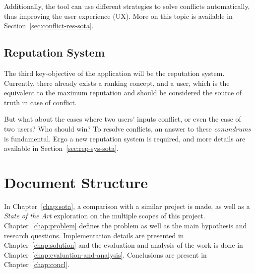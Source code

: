 Additionally, the tool can use different strategies to solve conflicts automatically, thus improving the user experience (UX). More on this topic is available in Section~\ref{sec:conflict-res-sota}.

\subsection*{Reputation System} \label{sec:rep-sys-intro}

The third key-objective of the application will be the reputation system. Currently, there already exists a ranking concept, and a  user, which is the equivalent to the maximum reputation and should be considered the source of truth in case of conflict.

But what about the cases where two  users' inputs conflict, or even the case of two  users? Who should win? To resolve conflicts, an answer to these \textit{conundrums} is fundamental. Ergo a new reputation system is required, and more details are available in Section~\ref{sec:rep-sys-sota}.

\section{Document Structure}

In Chapter~\ref{chap:sota}, a comparison with a similar project is made, as well as a \textit{State of the Art} exploration on the multiple scopes of this project. Chapter~\ref{chap:problem} defines the problem as well as the main hypothesis and research questions. Implementation details are presented in Chapter~\ref{chap:solution} and the evaluation and analysis of the work is done in Chapter~\ref{chap:evaluation-and-analysis}. Conclusions are present in Chapter~\ref{chap:concl}. 